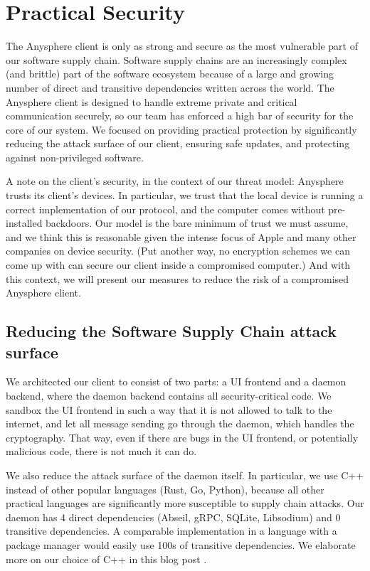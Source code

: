 \section{Practical Security}

The Anysphere client is only as strong and secure as the most vulnerable part of our software supply chain. Software supply chains are an increasingly complex (and brittle) part of the software ecosystem because of a large and growing number of direct and transitive dependencies written across the world. 
The Anysphere client is designed to handle extreme private and critical communication securely, so our team has enforced a high bar of security for the core of our system. We focused on providing practical protection by significantly reducing the attack surface of our client, ensuring safe updates, and protecting against non-privileged software. 

A note on the client's security, in the context of our threat model: Anysphere trusts its client's devices. 
In particular, we trust that the local device is running a correct implementation of our protocol, and the computer comes without pre-installed backdoors. 
Our model is the bare minimum of trust we must assume, and we think this is reasonable given the intense focus of Apple and many other companies on device security. 
(Put another way, no encryption schemes we can come up with can secure our client inside a compromised computer.)
And with this context, we will present our measures to reduce the risk of a compromised Anysphere client.

\subsection{Reducing the Software Supply Chain attack surface}

We architected our client to consist of two parts: a UI frontend and a daemon backend, where the daemon backend contains all security-critical code. We sandbox the UI frontend in such a way that it is not allowed to talk to the internet, and let all message sending go through the daemon, which handles the cryptography. That way, even if there are bugs in the UI frontend, or potentially malicious code, there is not much it can do.


We also reduce the attack surface of the daemon itself. In particular, we use C++ instead of other popular languages (Rust, Go, Python), because all other practical languages are significantly more susceptible to supply chain attacks. Our daemon has 4 direct dependencies (Abseil, gRPC, SQLite, Libsodium) and 0 transitive dependencies. A comparable implementation in a language with a package manager would easily use 100s of transitive dependencies. We elaborate more on our choice of C++ in this blog post .

